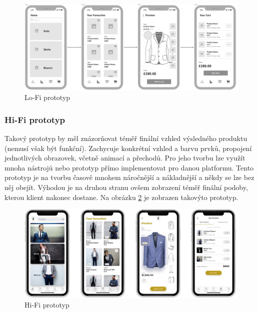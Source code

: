 \documentclass[thesis=M,czech]{FITthesis}[2019/12/23]
\begin{document}
\begin{figure}
	\centering
	\includegraphics[width=1\linewidth]{images/lo-fi-prototype.jpg}
  	\caption{Lo-Fi prototyp \cite{prototype-examples}}
  	\label{img:lo-fi-prototyp}
\end{figure}

\subsubsection{Hi-Fi prototyp}
Takový prototyp by měl znázorňovat téměř finální vzhled výsledného produktu (nemusí však být funkční). Zachycuje konkrétní vzhled a barvu prvků, propojení jednotlivých obrazovek, včetně animací a přechodů. Pro jeho tvorbu lze využít mnoha nástrojů nebo prototyp přímo implementovat pro danou platformu. Tento prototyp je na tvorbu časově mnohem náročnější a nákladnější a někdy se lze bez něj obejít. Výhodou je na druhou stranu ovšem zobrazení téměř finální podoby, kterou klient nakonec dostane. Na obrázku \ref{img:hi-fi-prototyp} je zobrazen takovýto prototyp. \cite{prototypes-difference}

\begin{figure}
	\centering
	\includegraphics[width=1\linewidth]{images/hi-fi-prototype.jpg}
  	\caption{Hi-Fi prototyp \cite{prototype-examples}}
  	\label{img:hi-fi-prototyp}
\end{figure}
\end{document}
